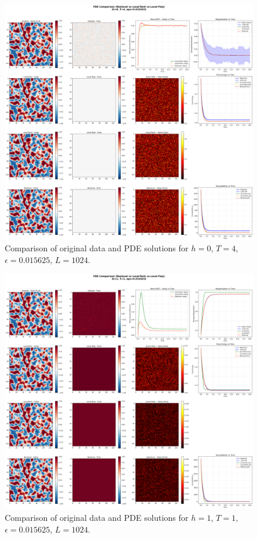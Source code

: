 \documentclass[11pt,a4paper]{article}
\begin{document}
\begin{figure}[!h]
    \centering
    \includegraphics[width=1.0\textwidth]{fig/compare_pde_solvers_L1024_h0_T4_eps0.015625.png}
    \caption{Comparison of original data and PDE solutions for $h=0$, $T=4$, $\epsilon=0.015625$, $L=1024$.}
    \label{fig:pde_comparison_h0_T4_eps0.015625}
\end{figure}


\begin{figure}[!h]
    \centering
    \includegraphics[width=1.0\textwidth]{fig/compare_pde_solvers_L1024_h1_T1_eps0.015625.png}
    \caption{Comparison of original data and PDE solutions for $h=1$, $T=1$, $\epsilon=0.015625$, $L=1024$.}
    \label{fig:pde_comparison_h1_T1_eps0.015625}
\end{figure}
\end{document}
